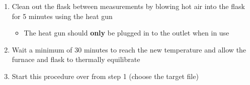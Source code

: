 \documentclass[letterpaper,11pt]{article}
\begin{document}
\begin{enumerate}
    \item Clean out the flask between measurements by blowing hot air into
            the flask for 5 minutes using the heat gun
            \begin{itemize}
            \item The heat gun should \textbf{only} be plugged in to the outlet 
                when in use
            \end{itemize}
            
        \item Wait a minimum of 30 minutes to reach the new temperature and 
            allow the furnace and flask to thermally equilibrate
    \item Start this procedure over from step 1 (choose the target file)
    \end{enumerate}

    
\end{document}
